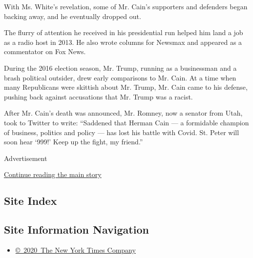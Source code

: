 With Ms. White's revelation, some of Mr. Cain's supporters and defenders
began backing away, and he eventually dropped out.

The flurry of attention he received in his presidential run helped him
land a job as a radio host in 2013. He also wrote columns for Newsmax
and appeared as a commentator on Fox News.

During the 2016 election season, Mr. Trump, running as a businessman and
a brash political outsider, drew early comparisons to Mr. Cain. At a
time when many Republicans were skittish about Mr. Trump, Mr. Cain came
to his defense, pushing back against accusations that Mr. Trump was a
racist.

After Mr. Cain's death was announced, Mr. Romney, now a senator from
Utah, took to Twitter to write: ``Saddened that Herman Cain --- a
formidable champion of business, politics and policy --- has lost his
battle with Covid. St. Peter will soon hear `999!' Keep up the fight, my
friend.''

Advertisement

\protect\hyperlink{after-bottom}{Continue reading the main story}

\hypertarget{site-index}{%
\subsection{Site Index}\label{site-index}}

\hypertarget{site-information-navigation}{%
\subsection{Site Information
Navigation}\label{site-information-navigation}}

\begin{itemize}
\tightlist
\item
  \href{https://help.nytimes.com/hc/en-us/articles/115014792127-Copyright-notice}{©~2020~The
  New York Times Company}
\end{itemize}

